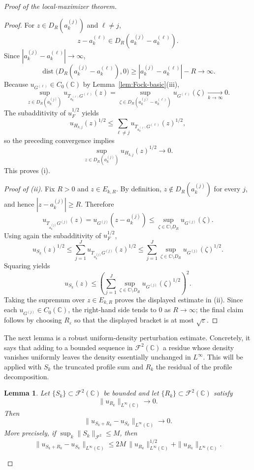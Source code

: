 \documentclass[a4paper,11pt,reqno]{amsart}
\numberwithin{equation}{section}
\theoremstyle{plain} %
\newtheorem{lemma}{Lemma}[section]
\theoremstyle{definition} %
\theoremstyle{remark}
\newcommand{\C}{\mathbb{C}}
\begin{document}
\begin{proof}[Proof of the local-maximizer theorem]
\begin{proof}
For \(z\in D_R(a_k^{(j)})\) and \(\ell\neq j\),
\[
z-a_k^{(\ell)}\in D_R(a_k^{(j)}-a_k^{(\ell)}).
\]
Since \(|a_k^{(j)}-a_k^{(\ell)}|\to\infty\),
\[
\operatorname{dist}\big(D_R(a_k^{(j)}-a_k^{(\ell)}),0\big)
\ge |a_k^{(j)}-a_k^{(\ell)}|-R\to\infty.
\]
Because \(u_{G^{(\ell)}}\in C_0(\C)\) by Lemma~\ref{lem:Fock-basic}(iii),
\[
\sup_{z\in D_R(a_k^{(j)})} u_{T_{a_k^{(\ell)}}G^{(\ell)}}(z)
=
\sup_{\zeta\in D_R(a_k^{(j)}-a_k^{(\ell)})} u_{G^{(\ell)}}(\zeta)
\xrightarrow[k\to\infty]{} 0.
\]
The subadditivity of \(u_F^{1/2}\) yields
\[
u_{H_{k,j}}(z)^{1/2}
\le
\sum_{\ell\neq j} u_{T_{a_k^{(\ell)}}G^{(\ell)}}(z)^{1/2},
\]
so the preceding convergence implies
\[
\sup_{z\in D_R(a_k^{(j)})} u_{H_{k,j}}(z)^{1/2}\to 0.
\]
This proves (i).

\medskip
\noindent\emph{Proof of (ii).}
Fix \(R>0\) and \(z\in E_{k,R}\). By definition, \(z\notin D_R(a_k^{(j)})\)
for every \(j\), and hence \(|z-a_k^{(j)}|\ge R\). Therefore
\[
u_{T_{a_k^{(j)}}G^{(j)}}(z)
=
u_{G^{(j)}}(z-a_k^{(j)})
\le
\sup_{\zeta\in \C\setminus D_R}u_{G^{(j)}}(\zeta).
\]
Using again the subadditivity of \(u_F^{1/2}\),
\[
u_{S_k}(z)^{1/2}
\le
\sum_{j=1}^J u_{T_{a_k^{(j)}}G^{(j)}}(z)^{1/2}
\le
\sum_{j=1}^J \sup_{\zeta\in \C\setminus D_R}u_{G^{(j)}}(\zeta)^{1/2}.
\]
Squaring yields
\[
u_{S_k}(z)
\le
\left(
\sum_{j=1}^J \sup_{\zeta\in \C\setminus D_R}u_{G^{(j)}}(\zeta)^{1/2}
\right)^2.
\]
Taking the supremum over \(z\in E_{k,R}\) proves the displayed estimate in
(ii). Since each \(u_{G^{(j)}}\in C_0(\C)\), the right-hand side tends to
\(0\) as \(R\to\infty\); the final claim follows by choosing
\(R_\varepsilon\) so that the displayed bracket is at most
\(\sqrt{\varepsilon}\).
\end{proof}

The next lemma is a robust uniform-density perturbation estimate. Concretely,
it says that adding to a bounded sequence in \(\mathcal F^2(\C)\) a residue
whose density vanishes uniformly leaves the density essentially unchanged in
\(L^\infty\). This will be applied with \(S_k\) the truncated profile sum and
\(R_k\) the residual of the profile decomposition.

\begin{lemma}\label{lem:density-perturbation-global}
Let \(\{S_k\}\subset \mathcal F^2(\C)\) be bounded and let
\(\{R_k\}\subset \mathcal F^2(\C)\) satisfy
\[
\|u_{R_k}\|_{L^\infty(\C)}\to 0.
\]
Then
\[
\|u_{S_k+R_k}-u_{S_k}\|_{L^\infty(\C)}\to 0.
\]
More precisely, if \(\sup_k \|S_k\|_{\mathcal F^2}\le M\), then
\[
\|u_{S_k+R_k}-u_{S_k}\|_{L^\infty(\C)}
\le
2M\,\|u_{R_k}\|_{L^\infty(\C)}^{1/2}
+\|u_{R_k}\|_{L^\infty(\C)}.
\]
\end{lemma}


\end{proof}
\end{document}
